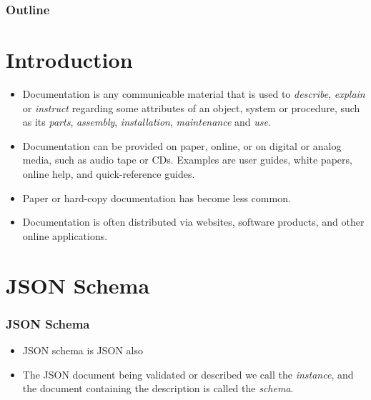 \documentclass{efd-lecture}
\begin{document}
\begin{frame}
  \titlepage{}
\end{frame}
\begin{frame}
  \frametitle{Outline}
  \tableofcontents{}
\end{frame}

\section{Introduction}

\begin{frame}
  \begin{itemize}
    \item Documentation is any communicable material that is used to \textit{\color{YellowOrange}describe}, \textit{\color{YellowOrange}explain} or \textit{\color{YellowOrange}instruct}
      regarding some attributes of an object, system or procedure,
      such as its \textit{\color{LimeGreen}parts}, \textit{\color{LimeGreen}assembly}, \textit{\color{LimeGreen}installation},
      \textit{\color{LimeGreen}maintenance} and \textit{\color{LimeGreen}use}.
    \item Documentation can be provided on paper, online, or on digital or analog media, such as audio tape or CDs. Examples are user guides, white papers, online help, and quick-reference guides.
    \item Paper or hard-copy documentation has become less common.
    \item Documentation is often distributed via websites, software products, and other online applications.
  \end{itemize}
\end{frame}

\section{JSON Schema}

\begin{frame}
  \frametitle{JSON Schema}
  \begin{itemize}
    \item JSON schema is JSON also
    \item The JSON document being validated or described we call the
      \textit{\color{YellowOrange} instance}, and the document containing the
      description is called the \textit{\color{GreenYellow} schema}.
  \end{itemize}
\end{frame}
\end{document}
